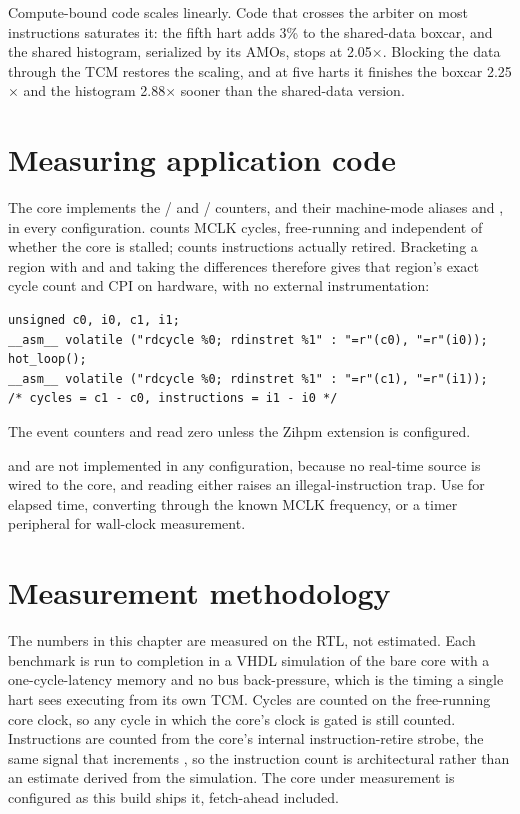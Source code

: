 \documentclass[11pt,pdftex,openany,letterpaper]{report}
\begin{document}
Compute-bound code scales linearly. Code that crosses the arbiter on most instructions saturates it: the fifth hart adds 3\% to the shared-data boxcar, and the shared histogram, serialized by its AMOs, stops at 2.05$\times$. Blocking the data through the TCM restores the scaling, and at five harts it finishes the boxcar 2.25$\times$ and the histogram 2.88$\times$ sooner than the shared-data version.

\fi
\section{Measuring application code} \label{ss:cpi-measure}

The core implements the / and / counters, and their machine-mode aliases  and , in every configuration.  counts MCLK cycles, free-running and independent of whether the core is stalled;  counts instructions actually retired. Bracketing a region with  and  and taking the differences therefore gives that region's exact cycle count and CPI on hardware, with no external instrumentation:

\begin{lstlisting}[style=customC]
unsigned c0, i0, c1, i1;
__asm__ volatile ("rdcycle %0; rdinstret %1" : "=r"(c0), "=r"(i0));
hot_loop();
__asm__ volatile ("rdcycle %0; rdinstret %1" : "=r"(c1), "=r"(i1));
/* cycles = c1 - c0, instructions = i1 - i0 */
\end{lstlisting}

The event counters  and  read zero unless the Zihpm extension is configured.

 and  are not implemented in any configuration, because no real-time source is wired to the core, and reading either raises an illegal-instruction trap. Use  for elapsed time, converting through the known MCLK frequency, or a timer peripheral for wall-clock measurement.

\section{Measurement methodology} \label{ss:cpi-method}

The numbers in this chapter are measured on the RTL, not estimated. Each benchmark is run to completion in a VHDL simulation of the bare core with a one-cycle-latency memory and no bus back-pressure, which is the timing a single hart sees executing from its own TCM. Cycles are counted on the free-running core clock, so any cycle in which the core's clock is gated is still counted. Instructions are counted from the core's internal instruction-retire strobe, the same signal that increments , so the instruction count is architectural rather than an estimate derived from the simulation. The core under measurement is configured as this build ships it, fetch-ahead included.
\end{document}
